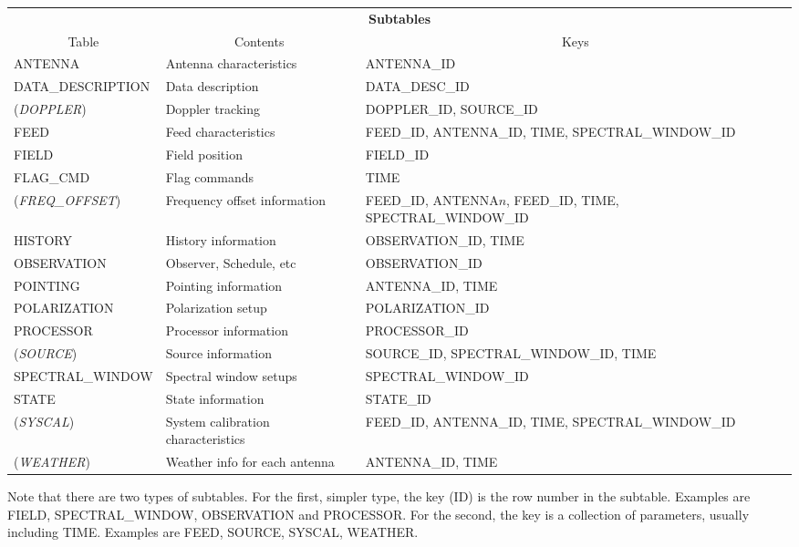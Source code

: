 \documentclass{article}
\begin{document}
\begin{itemize}
\begin{tabular}{|l|p{1.5in}|p{1.6in}|} \hline
\multicolumn{3}{|c|}{\bf Subtables}\\ \cline{1-3}
\multicolumn{1}{|c|}{Table}&\multicolumn{1}{|c|}{Contents}&\multicolumn{1}{|c|}{Keys}\\ \cline{1-3}
ANTENNA& Antenna characteristics & ANTENNA\_ID \\
DATA\_DESCRIPTION & Data description & DATA\_DESC\_ID\\
({\it DOPPLER}) & Doppler tracking & DOPPLER\_ID, SOURCE\_ID \\
FEED  &          Feed characteristics & FEED\_ID, ANTENNA\_ID, TIME, SPECTRAL\_WINDOW\_ID \\
FIELD  &         Field position & FIELD\_ID  \\
FLAG\_CMD  &  Flag commands & TIME \\
({\it FREQ\_OFFSET}) & Frequency offset information & FEED\_ID, ANTENNA$n$, FEED\_ID, TIME, SPECTRAL\_WINDOW\_ID \\
HISTORY  & History information & OBSERVATION\_ID, TIME \\
OBSERVATION  &Observer, Schedule, etc & OBSERVATION\_ID \\ 
POINTING & Pointing information & ANTENNA\_ID, TIME \\
POLARIZATION &Polarization setup & POLARIZATION\_ID \\
PROCESSOR & Processor information & PROCESSOR\_ID  \\
({\it SOURCE})  &        Source information & SOURCE\_ID, SPECTRAL\_WINDOW\_ID, TIME \\
SPECTRAL\_WINDOW  &     Spectral window setups & SPECTRAL\_WINDOW\_ID \\
STATE   & State information & STATE\_ID \\
({\it SYSCAL}) &         System calibration characteristics & FEED\_ID, ANTENNA\_ID, TIME, SPECTRAL\_WINDOW\_ID \\
({\it WEATHER})  &       Weather info for each antenna & ANTENNA\_ID, TIME \\
\hline
\end{tabular}

\par
Note that there are two types of subtables. For the first, simpler
type, the key (ID) is the row number in the subtable. 
Examples are FIELD, SPECTRAL\_WINDOW, OBSERVATION
and PROCESSOR. For the second, the key is a collection of parameters,
usually including TIME. Examples are FEED, SOURCE, SYSCAL, WEATHER.


\end{itemize}
\end{document}
